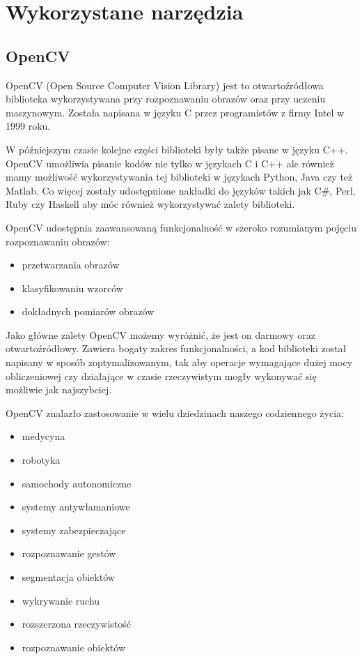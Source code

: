 \documentclass[a4paper,12pt,twoside,openany]{report}
\begin{document}
\chapter{Wykorzystane narzędzia}

\section{OpenCV}
OpenCV (Open Source Computer Vision Library) jest to otwartoźródłowa biblioteka wykorzystywana przy rozpoznawaniu obrazów oraz przy uczeniu maszynowym. Została napisana w języku C przez programistów z firmy Intel w 1999 roku.

W późniejszym czasie kolejne części biblioteki były także pisane w języku C++. OpenCV umożliwia pisanie kodów nie tylko w językach C i C++ ale również mamy możliwość wykorzystywania tej biblioteki w językach Python, Java czy też Matlab. Co więcej zostały udostępnione nakładki do języków takich jak C\#, Perl, Ruby czy Haskell aby móc również wykorzystywać zalety  biblioteki. 

OpenCV udostępnia zaawansowaną funkcjonalność  w szeroko rozumianym pojęciu rozpoznawaniu obrazów:

\begin{itemize}
	\item przetwarzania obrazów
	\item klasyfikowaniu wzorców
	\item dokładnych pomiarów obrazów
\end{itemize}

Jako główne zalety OpenCV możemy wyróżnić, że jest on darmowy oraz otwartoźródłowy. Zawiera bogaty zakres funkcjonalności, a kod biblioteki został napisany w sposób zoptymalizowanym, tak aby operacje wymagające dużej mocy obliczeniowej czy działające w czasie rzeczywistym mogły wykonywać się możliwie jak najszybciej.

OpenCV znalazło zastosowanie w wielu dziedzinach naszego codziennego życia:
\begin{itemize} 
	\item medycyna
	\item robotyka
	\item samochody autonomiczne
	\item systemy antywłamaniowe 
	\item systemy zabezpieczające
	\item rozpoznawanie gestów
	\item segmentacja obiektów
	\item wykrywanie ruchu
	\item rozszerzona rzeczywistość
	\item rozpoznawanie obiektów
\end{itemize}
\end{document}
